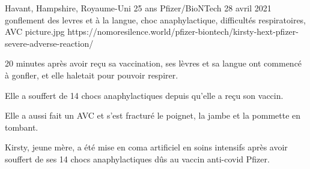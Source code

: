           {Havant, Hampshire, Royaume-Uni}
          {25 ans}
          {Pfizer/BioNTech}
          {28 avril 2021}
          {
            gonflement des levres et à la langue,
            choc anaphylactique,
            difficultés respiratoires,
            AVC
          }
          {picture.jpg}
          {https://nomoresilence.world/pfizer-biontech/kirsty-hext-pfizer-severe-adverse-reaction/}
          {

20 minutes après avoir reçu sa vaccination, ses lèvres et sa langue ont commencé
à gonfler, et elle haletait pour pouvoir respirer.

Elle a souffert de 14 chocs anaphylactiques depuis qu'elle a reçu son vaccin.

Elle a aussi fait un AVC et s'est fracturé le poignet, la jambe et la pommette
en tombant.

Kirsty, jeune mère, a été mise en coma artificiel en soins intensifs après avoir
souffert de ses 14 chocs anaphylactiques dûs au vaccin anti-covid Pfizer.

}
